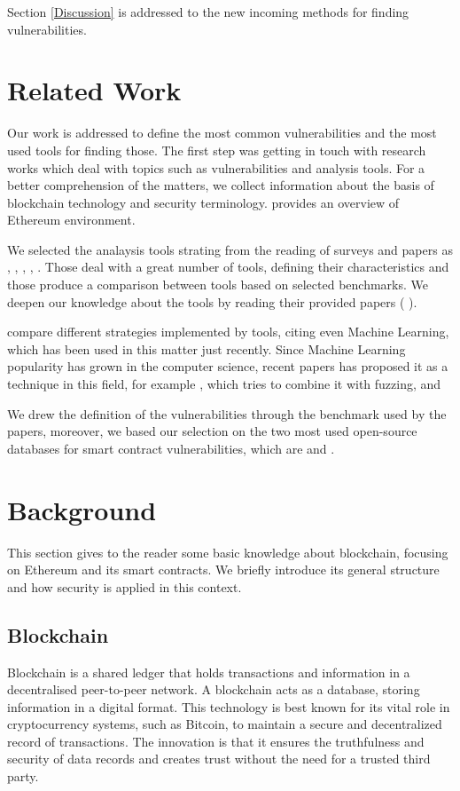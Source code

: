 \documentclass[a4paper,sigconf, language=french,
language=german, language=spanish, language=english]{acmart}
\begin{document}
Section \ref{Discussion} is addressed to the new incoming methods for finding vulnerabilities.




\section{Related Work}
\label{RelatedWork}
Our work is addressed to define the most common vulnerabilities and the most used tools for finding those.
The first step was getting in touch with research works which deal with topics such as vulnerabilities and analysis tools. For a better comprehension of the matters, we collect information about the basis of blockchain technology and security terminology. \cite{ETHfoundation} provides an overview 
of Ethereum environment. 

We selected the analaysis tools strating from the reading of surveys and papers as \cite{SurvTools}, \cite{Thesis}, \cite{AutomaticTools}, \cite{AttacksAndProtection}, \cite{ToolsAndVuln}. 
Those deal with a great number of tools, defining their characteristics and those produce a comparison between tools based on selected benchmarks. We deepen our knowledge about the tools by reading their provided papers
(\cite{Slither} \cite{Echidna} \cite{Manticore} \cite{SmartTest} \cite{Oyente}). 

\cite{Methodologies} compare different strategies implemented by tools, citing even Machine Learning, which has been used in this matter just recently.
Since Machine Learning popularity has grown in the computer science, recent papers has proposed it as a technique in this field, for example \cite{FuzzML}, which tries to combine it with fuzzing, and \cite{MLSmartContractPropose}

We drew the definition of the vulnerabilities through the benchmark used by the papers, moreover, we based our selection on the two most used open-source databases for smart contract vulnerabilities, which are \cite{SWC} and \cite{DASP10}.

\section{Background}
\label{Background}
This section gives to the reader some basic knowledge about blockchain, focusing on Ethereum and its smart contracts. We briefly introduce its general structure and how security is applied in this context.
\subsection{Blockchain}
Blockchain is a shared ledger that holds transactions and information in a decentralised peer-to-peer network. A blockchain acts as a database, storing information in a digital format. 
This technology is best known for its vital role in cryptocurrency systems, such as Bitcoin, to maintain a secure and decentralized record of transactions. 
The innovation is that it ensures the truthfulness and security of data records and creates trust without the need for a trusted third party.
\end{document}
